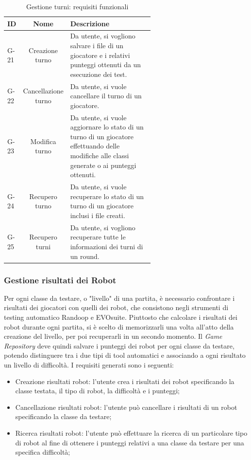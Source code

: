 \documentclass{article}
\begin{document}
\begin{table}[H]
  \center
  \begin{tabular}{|l|c|p{0.6\linewidth}|}
    \hline
    ID & Nome & Descrizione \\
    \hline
        G-21 & Creazione turno  & Da utente, si vogliono salvare i file di un giocatore e i relativi punteggi ottenuti da un esecuzione dei test. \\
        \hline
        G-22 & Cancellazione turno & Da utente, si vuole cancellare il turno di un giocatore. \\
        \hline
        G-23 & Modifica turno  & Da utente, si vuole aggiornare lo stato di un turno di un giocatore effettuando delle modifiche alle classi generate o ai punteggi ottenuti. \\
        \hline
        G-24 & Recupero turno  & Da utente, si vuole recuperare lo stato di un turno di un giocatore inclusi i file creati. \\
        \hline
        G-25 & Recupero turni  & Da utente, si vogliono recuperare tutte le informazioni dei turni di un round. \\
    \hline
  \end{tabular}
  \caption{Gestione turni: requisiti funzionali}
  \label{tab:2x_functional_requirements}
\end{table}


\subsubsection{Gestione risultati dei Robot}
Per ogni classe da testare, o "livello" di una partita, è necessario confrontare i risultati dei giocatori con quelli dei robot, che consistono negli strumenti di testing automatico Randoop e EVOsuite. Piuttosto che calcolare i risultati dei robot durante ogni partita, si è scelto di memorizzarli una volta all'atto della creazione del livello, per poi recuperarli in un secondo momento. Il \textit{Game Repository} deve quindi salvare i punteggi dei robot per ogni classe da testare, potendo distinguere tra i due tipi di tool automatici e associando a ogni risultato un livello di difficoltà.
I requisiti generati sono i seguenti:
\begin{itemize}
    \item Creazione risultati robot: l'utente crea i risultati dei robot specificando la classe testata, il tipo di robot, la difficoltà e i punteggi;
    \item Cancellazione risultati robot: l'utente può cancellare i risultati di un robot specificando la classe da testare;
    \item Ricerca risultati robot: l'utente può effettuare la ricerca di un particolare tipo di robot al fine di ottenere i punteggi relativi a una classe da testare per una specifica difficoltà;
\end{itemize}
\end{document}
